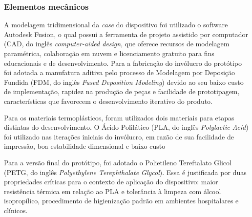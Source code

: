 \subsubsection{Elementos mecânicos}

A modelagem tridimensional da \textit{case} do dispositivo foi utilizado o software Autodesk Fusion, o qual possui a ferramenta de projeto assistido por computador (CAD, do inglês \textit{computer-aided design}, que oferece recursos de modelagem paramétrica, colaboração em nuvem e licenciamento gratuito para fins educacionais e de desenvolvimento. Para a fabricação do invólucro do protótipo foi adotada a manufatura aditiva pelo processo de Modelagem por Deposição Fundida (FDM, do inglês \textit{Fused Deposition Modeling}) devido ao seu baixo custo de implementação, rapidez na produção de peças e facilidade de prototipagem, características que favorecem o desenvolvimento iterativo do produto.

Para os materiais termoplásticos, foram utilizados dois materiais para etapas distintas do desenvolvimento. O Ácido Polilático (PLA, do inglês \textit{Polylactic Acid}) foi utilizado nas iterações iniciais do invólucro, em razão de sua facilidade de impressão, boa estabilidade dimensional e baixo custo

Para a versão final do protótipo, foi adotado o Polietileno Tereftalato Glicol (PETG, do inglês \textit{Polyethylene Terephthalate Glycol}). Essa é justificada por duas propriedades críticas para o contexto de aplicação do dispositivo: maior resistência térmica em relação ao PLA e tolerância à limpeza com álcool isopropílico, procedimento de higienização padrão em ambientes hospitalares e clínicos.




